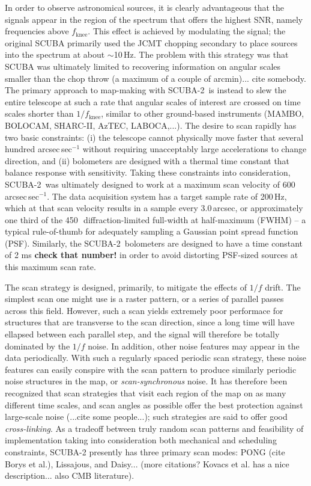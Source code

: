 \documentclass[useAMS,usenatbib,nofootinbib]{mn2e}
\newcommand{\snr}{SNR}
\newcommand{\scuba}{SCUBA-2}
\begin{document}
In order to observe astronomical sources, it is clearly advantageous
that the signals appear in the region of the spectrum that offers the
highest \snr, namely frequencies above $f_\mathrm{knee}$. This effect
is achieved by modulating the signal; the original SCUBA primarily
used the JCMT chopping secondary to place sources into the spectrum at
about $\sim$10\,Hz. The problem with this strategy was that SCUBA was
ultimately limited to recovering information on angular scales smaller
than the chop throw (a maximum of a couple of arcmin)... cite
somebody. The primary approach to map-making with \scuba\ is instead
to slew the entire telescope at such a rate that angular scales of
interest are crossed on time scales shorter than $1/f_\mathrm{knee}$,
similar to other ground-based instruments (MAMBO, BOLOCAM, SHARC-II,
AzTEC, LABOCA,...). The desire to scan rapidly has two basic
constraints: (i) the telescope cannot physically move faster that
several hundred arcsec\,sec$^{-1}$ without requiring unacceptably
large accelerations to change direction, and (ii) bolometers are
designed with a thermal time constant that balance response with
sensitivity. Taking these constraints into consideration, \scuba\ was
ultimately designed to work at a maximum scan velocity of
600\,arcsec\,sec$^{-1}$. The data acquisition system has a target
sample rate of 200\,Hz, which at that scan velocity results in a
sample every 3.0\,arcsec, or approximately one third of the
450\,\micron\ diffraction-limited full-width at half-maximum (FWHM) --
a typical rule-of-thumb for adequately sampling a Gaussian point
spread function (PSF). Similarly, the \scuba\ bolometers are designed
to have a time constant of 2 ms \textbf{check that number!} in order
to avoid distorting PSF-sized sources at this maximum scan rate.

The scan strategy is designed, primarily, to mitigate the effects of
$1/f$ drift. The simplest scan one might use is a raster pattern, or a
series of parallel passes across this field. However, such a scan
yields extremely poor performace for structures that are transverse to
the scan direction, since a long time will have ellapsed between each
parallel step, and the signal will therefore be totally dominated by
the $1/f$ noise. In addition, other noise features may appear in the
data periodically. With such a regularly spaced periodic scan
strategy, these noise features can easily conspire with the scan
pattern to produce similarly periodic noise structures in the map, or
\emph{scan-synchronous} noise. It has therefore been recognized that
scan strategies that visit each region of the map on as many different
time scales, and scan angles as possible offer the best protection
against large-scale noise (...cite some people...); such strategies
are said to offer good \emph{cross-linking}. As a tradeoff between
truly random scan patterns and feasibility of implementation taking
into consideration both mechanical and scheduling constraints, \scuba
presently has three primary scan modes: PONG (cite Borys et al.),
Lissajous, and Daisy... (more citations? Kovacs et al. has a nice
description... also CMB literature).
\end{document}

